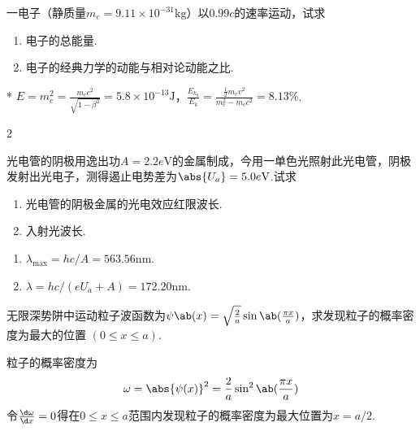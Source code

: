 \begin{problem}[相对论能动量关系][6]
    一电子（静质量$m_e=9.11\times 10^{-31}\mathrm{kg}$）以$0.99c$的速率运动，试求
\begin{enumerate}
    \item 电子的总能量.
    \item 电子的经典力学的动能与相对论动能之比.
\end{enumerate}
\end{problem}
\begin{solution}*
    $E=m_c^2=\frac{m_ec^2}{\sqrt{1-\beta^2}}=5.8\times 10^{-13}\mathrm{J}$，$\frac{E_{k_0}}{E_k}=\frac{\frac{1}{2}m_ev^2}{m_c^2-m_ec^2}=8.13\%$.
\end{solution}

\begin{multicols*}{2}
\begin{problem}[光电效应][6]
    光电管的阴极用逸出功$A=2.2e\mathrm{V}$的金属制成，今用一单色光照射此光电管，阴极发射出光电子，测得遏止电势差为$\abs{U_a}=5.0e\mathrm{V}$.试求
\begin{enumerate}
    \item 光电管的阴极金属的光电效应红限波长.
    \item 入射光波长.
\end{enumerate}
\end{problem}
\begin{solution}
\begin{enumerate}
    \item $\lambda_{\max}=hc/A=563.56\mathrm{nm}$.
    \item $\lambda=hc/(eU_a+A)=172.20\mathrm{nm}$.
\end{enumerate}
\end{solution}
\begin{problem}[][5]
    无限深势阱中运动粒子波函数为$\psi\ab(x)=\sqrt{\frac{2}{a}}\sin\ab(\frac{\pi x}{a})$，求发现粒子的概率密度为最大的位置 $(0\leq x\leq a)$.
\end{problem}
\begin{solution}
粒子的概率密度为
\[\omega=\abs{\psi(x)}^2=\frac2a\sin^2\ab(\frac{\pi x}{a})\]
    令$\frac{\d\omega}{\d x}=0$得在$0\leq x\leq a$范围内发现粒子的概率密度为最大位置为$x=a/2$. 
\end{solution}
\end{multicols*}